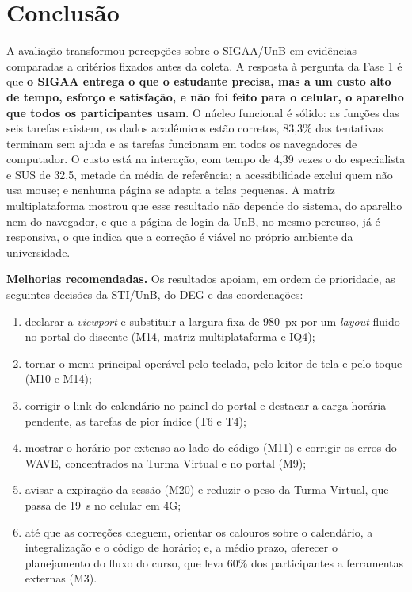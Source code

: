 \section{Conclusão}
\label{sec:conclusao}

A avaliação transformou percepções sobre o SIGAA/UnB em evidências comparadas a critérios fixados antes da coleta. A resposta à pergunta da Fase 1 é que \textbf{o SIGAA entrega o que o estudante precisa, mas a um custo alto de tempo, esforço e satisfação, e não foi feito para o celular, o aparelho que todos os participantes usam}. O núcleo funcional é sólido: as funções das seis tarefas existem, os dados acadêmicos estão corretos, 83,3\% das tentativas terminam sem ajuda e as tarefas funcionam em todos os navegadores de computador. O custo está na interação, com tempo de 4,39 vezes o do especialista e SUS de 32,5, metade da média de referência; a acessibilidade exclui quem não usa mouse; e nenhuma página se adapta a telas pequenas. A matriz multiplataforma mostrou que esse resultado não depende do sistema, do aparelho nem do navegador, e que a página de login da UnB, no mesmo percurso, já é responsiva, o que indica que a correção é viável no próprio ambiente da universidade.

\textbf{Melhorias recomendadas.} Os resultados apoiam, em ordem de prioridade, as seguintes decisões da STI/UnB, do DEG e das coordenações:
\begin{enumerate}
	\item declarar a \textit{viewport} e substituir a largura fixa de 980~px por um \textit{layout} fluido no portal do discente (M14, matriz multiplataforma e IQ4);
	\item tornar o menu principal operável pelo teclado, pelo leitor de tela e pelo toque (M10 e M14);
	\item corrigir o link do calendário no painel do portal e destacar a carga horária pendente, as tarefas de pior índice (T6 e T4);
	\item mostrar o horário por extenso ao lado do código (M11) e corrigir os erros do WAVE, concentrados na Turma Virtual e no portal (M9);
	\item avisar a expiração da sessão (M20) e reduzir o peso da Turma Virtual, que passa de 19~s no celular em 4G;
	\item até que as correções cheguem, orientar os calouros sobre o calendário, a integralização e o código de horário; e, a médio prazo, oferecer o planejamento do fluxo do curso, que leva 60\% dos participantes a ferramentas externas (M3).
\end{enumerate}

